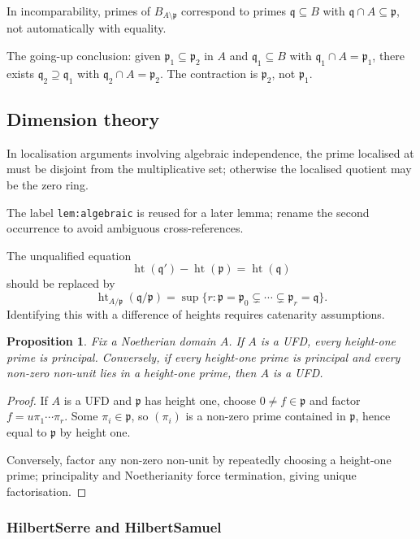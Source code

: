 \documentclass[12pt]{article}
\theoremstyle{plain}
\newtheorem{proposition}[thm]{Proposition}
\theoremstyle{definition}
\begin{document}
In incomparability, primes of $B_{A\setminus\mathfrak{p}}$ correspond to primes $\mathfrak{q}\subseteq B$ with $\mathfrak{q}\cap A\subseteq\mathfrak{p}$, not automatically with equality.

The going-up conclusion: given $\mathfrak{p}_1\subseteq\mathfrak{p}_2$ in $A$ and $\mathfrak{q}_1\subseteq B$ with $\mathfrak{q}_1\cap A=\mathfrak{p}_1$, there exists $\mathfrak{q}_2\supseteq\mathfrak{q}_1$ with $\mathfrak{q}_2\cap A=\mathfrak{p}_2$. The contraction is $\mathfrak{p}_2$, not $\mathfrak{p}_1$.

\subsection{Dimension theory}

In localisation arguments involving algebraic independence, the prime localised at must be disjoint from the multiplicative set; otherwise the localised quotient may be the zero ring.

The label \verb|lem:algebraic| is reused for a later lemma; rename the second occurrence to avoid ambiguous cross-references.

The unqualified equation
\[
\operatorname{ht}(\mathfrak{q}')-\operatorname{ht}(\mathfrak{p})=\operatorname{ht}(\mathfrak{q})
\]
should be replaced by
\[
\operatorname{ht}_{A/\mathfrak{p}}(\mathfrak{q}/\mathfrak{p})=\sup\{r:\mathfrak{p}=\mathfrak{p}_0\subsetneq\cdots\subsetneq\mathfrak{p}_r=\mathfrak{q}\}.
\]
Identifying this with a difference of heights requires catenarity assumptions.

\begin{proposition}
Fix a Noetherian domain $A$. If $A$ is a UFD, every height-one prime is principal. Conversely, if every height-one prime is principal and every non-zero non-unit lies in a height-one prime, then $A$ is a UFD.
\end{proposition}
\begin{proof}
If $A$ is a UFD and $\mathfrak{p}$ has height one, choose $0\ne f\in\mathfrak{p}$ and factor $f=u\pi_1\cdots\pi_r$. Some $\pi_i\in\mathfrak{p}$, so $(\pi_i)$ is a non-zero prime contained in $\mathfrak{p}$, hence equal to $\mathfrak{p}$ by height one.

Conversely, factor any non-zero non-unit by repeatedly choosing a height-one prime; principality and Noetherianity force termination, giving unique factorisation.
\end{proof}

\subsubsection*{Hilbert\textendash Serre and Hilbert\textendash Samuel}
\end{document}

